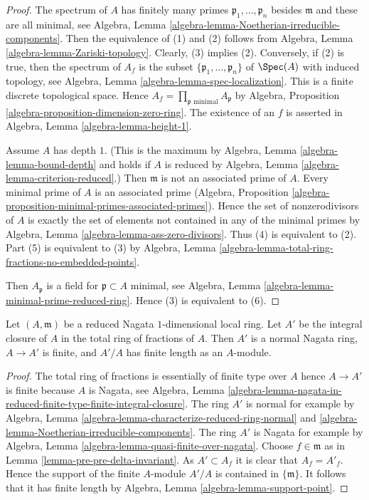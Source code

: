 \begin{proof}
The spectrum of $A$ has finitely many primes
$\mathfrak p_1, \ldots, \mathfrak p_n$ besides $\mathfrak m$
and these are all minimal, see
Algebra, Lemma \ref{algebra-lemma-Noetherian-irreducible-components}.
Then the equivalence of (1) and (2) follows from
Algebra, Lemma \ref{algebra-lemma-Zariski-topology}.
Clearly, (3) implies (2). Conversely, if (2) is true,
then the spectrum of $A_f$ is the subset
$\{\mathfrak p_1, \ldots, \mathfrak p_n\}$ of $\Spec(A)$
with induced topology, see
Algebra, Lemma \ref{algebra-lemma-spec-localization}.
This is a finite discrete topological space.
Hence $A_f = \prod_{\mathfrak p\text{ minimal}} A_\mathfrak p$ by
Algebra, Proposition \ref{algebra-proposition-dimension-zero-ring}.
The existence of an $f$ is asserted in
Algebra, Lemma \ref{algebra-lemma-height-1}.

\medskip\noindent
Assume $A$ has depth $1$. (This is the maximum by
Algebra, Lemma \ref{algebra-lemma-bound-depth} and holds if $A$ is reduced by
Algebra, Lemma \ref{algebra-lemma-criterion-reduced}.)
Then $\mathfrak m$ is not an associated prime of $A$.
Every minimal prime of $A$ is an associated prime
(Algebra, Proposition
\ref{algebra-proposition-minimal-primes-associated-primes}).
Hence the set of nonzerodivisors of $A$ is exactly the set of elements
not contained in any of the minimal primes by
Algebra, Lemma \ref{algebra-lemma-ass-zero-divisors}.
Thus (4) is equivalent to (2).
Part (5) is equivalent to (3) by
Algebra, Lemma \ref{algebra-lemma-total-ring-fractions-no-embedded-points}.

\medskip\noindent
Then $A_\mathfrak p$ is a field for
$\mathfrak p \subset A$ minimal, see
Algebra, Lemma \ref{algebra-lemma-minimal-prime-reduced-ring}.
Hence (3) is equivalent to (6).
\end{proof}

\begin{lemma}
\label{lemma-pre-delta-invariant}
Let $(A, \mathfrak m)$ be a reduced Nagata $1$-dimensional local ring.
Let $A'$ be the integral closure of $A$ in the total ring of fractions
of $A$. Then $A'$ is a normal Nagata ring, $A \to A'$ is finite, and
$A'/A$ has finite length as an $A$-module.
\end{lemma}

\begin{proof}
The total ring of fractions is essentially of finite type over $A$
hence $A \to A'$ is finite because $A$ is Nagata, see Algebra, Lemma
\ref{algebra-lemma-nagata-in-reduced-finite-type-finite-integral-closure}.
The ring $A'$ is normal for example by
Algebra, Lemma \ref{algebra-lemma-characterize-reduced-ring-normal} and
\ref{algebra-lemma-Noetherian-irreducible-components}.
The ring $A'$ is Nagata for example by
Algebra, Lemma \ref{algebra-lemma-quasi-finite-over-nagata}.
Choose $f \in \mathfrak m$ as in Lemma \ref{lemma-pre-pre-delta-invariant}.
As $A' \subset A_f$ it is clear that $A_f = A'_f$. Hence the support of the
finite $A$-module $A'/A$ is contained in $\{\mathfrak m\}$.
It follows that it has finite length by
Algebra, Lemma \ref{algebra-lemma-support-point}.
\end{proof}

